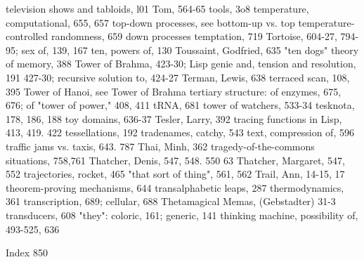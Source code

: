 television shows and tabloids, l01                Tom, 564-65 tools, 3o8
temperature, computational, 655, 657              top-down processes, see bottom-up vs. top
temperature-controlled randomness, 659              down processes
temptation, 719                                   Tortoise, 604-27, 794-95; sex of, 139, 167
ten, powers of, 130                               Toussaint, Godfried, 635
"ten dogs" theory of memory, 388                  Tower of Brahma, 423-30; Lisp genie and,
tension and resolution, 191                         427-30; recursive solution to, 424-27
Terman, Lewis, 638 terraced scan, 108, 395        Tower of Hanoi, see Tower of Brahma
tertiary structure: of enzymes, 675, 676; of      "tower of power," 408, 411
  tRNA, 681                                       tower of watchers, 533-34
tesknota, 178, 186, 188                           toy domains, 636-37
Tesler, Larry, 392                                tracing functions in Lisp, 413, 419. 422
tessellations, 192                                tradenames, catchy, 543
text, compression of, 596                         traffic jams vs. taxis, 643. 787
Thai, Minh, 362                                   tragedy-of-the-commons situations, 758,761
Thatcher, Denis, 547, 548. 550                      63
Thatcher, Margaret, 547, 552                      trajectories, rocket, 465
"that sort of thing", 561, 562                    Trail, Ann, 14-15, 17
theorem-proving mechanisms, 644                   transalphabetic leaps, 287
thermodynamics, 361                               transcription, 689; cellular, 688
Thetamagical Memas, (Gebstadter) 31-3             transducers, 608
"they": coloric, 161; generic, 141
thinking machine, possibility of, 493-525, 636

 Index                                                                                       850

